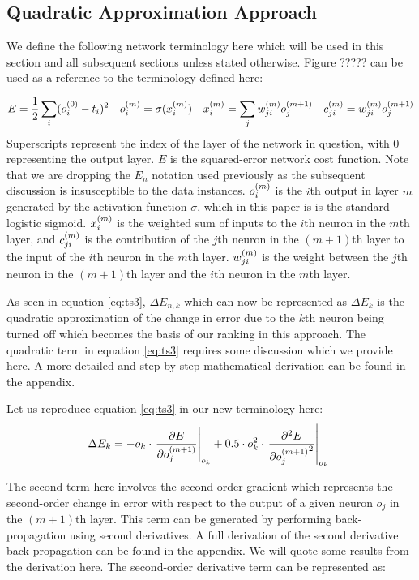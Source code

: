 \subsection{Quadratic Approximation Approach}

We define the following network terminology here which will be used in this section and all subsequent sections  unless stated otherwise. Figure ????? can be used as a reference to the terminology defined here:

\begin{align}
E &= \frac{1}{2}\sum\limits_i (o_{i}^{(0)} - t_{i})^2 &
o_{i}^{(m)} &= \sigma(x_{i}^{(m)}) &
x_{i}^{(m)} &= \sum\limits_j {w_{ji}^{(m)}}{ o_{j}^{(m + 1)}} &
c_{ji}^{(m)} = w_{ji}^{(m)} o_{j}^{(m+1)}\label{eq:term}
\end{align}
Superscripts represent the index of the layer of the network in question, with 0 representing the output layer. $E$ is the squared-error network cost function. Note that we are dropping the $E_n$ notation used previously as the subsequent discussion is insusceptible to the data instances. $o_{i}^{(m)}$ is the $i$th output in layer $m$ generated by the activation function $\sigma$, which in this paper is is the standard logistic sigmoid. $x_{i}^{(m)}$ is the weighted sum of inputs to the $i$th neuron in the $m$th layer, and $c_{ji}^{(m)}$ is the contribution of the $j$th neuron in the $(m+1)$th layer to the input of the $i$th neuron in the $m$th layer. $w_{ji}^{(m)}$ is the weight between the $j$th neuron in the $(m+1)$th layer and the $i$th neuron in the $m$th layer.

As seen in equation \ref{eq:ts3}, $\Delta E_{n,k}$ which can now be represented as $\Delta E_{k}$ is the quadratic approximation of the change in error due to the $k$th neuron being turned off which becomes the basis of our ranking in this approach. The quadratic term in equation \ref{eq:ts3} requires some discussion which we provide here. A more detailed and step-by-step mathematical derivation can be found in the appendix.

Let us reproduce equation \ref{eq:ts3} in our new terminology here: 
\begin{align}
\Delta E_{k} = - o_k\cdot \left.\pdv{E}{{o_{j}^{(m+1)}}}\right|_{o_k} + 0.5\cdot o_k^2\cdot \left.\pdv[2]{E}{{o_{j}^{(m+1)}}}\right|_{o_k}\
\end{align}

The second term here involves the second-order gradient which represents the second-order change in error with respect to the output of a given neuron $o_j$ in the $(m+1)$th layer. This term can be generated by performing back-propagation using second derivatives. A full derivation of the second derivative back-propagation can be found in the appendix. We will quote some results from the derivation here. The second-order derivative term can be represented as:

